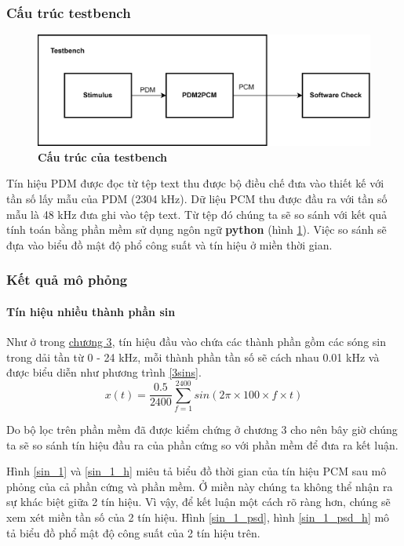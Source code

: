\subsubsection{Cấu trúc testbench}
\begin{figure}[H]
    \centering
    \includegraphics[width=13cm]{Images/Chuong4/tb/tb_top.png}
    \caption[Cấu trúc của testbench]{\bfseries \fontsize{12pt}{0pt}\selectfont  Cấu trúc của testbench}
    \label{tb_top}
\end{figure}

Tín hiệu PDM được đọc từ tệp text thu được bộ điều chế đưa vào thiết kế với tần số lấy mẫu của PDM (2304 kHz). Dữ liệu PCM thu được đầu ra với tần số mẫu là 48 kHz đưa ghi vào tệp text. Từ tệp đó chúng ta sẽ so sánh với kết quả tính toán bằng phần mềm sử dụng ngôn ngữ \textbf{python} (hình \ref{tb_top}). Việc so sánh sẽ đựa vào biểu đồ mật độ phổ công suất và tín hiệu ở miền thời gian.

\subsubsection{Kết quả mô phỏng}
\paragraph{Tín hiệu nhiều thành phần sin}
Như ở trong \hyperref[chuong3]{chương 3}, tín hiệu đầu vào chứa các thành phần gồm các sóng sin trong dải tần từ 0 - 24 kHz, mỗi thành phần tần số sẽ cách nhau 0.01 kHz và được biểu diễn như phương trình \ref{3sins}.
\begin{equation} \label{3sins}
    x(t) = \frac{0.5}{2400}\sum^{2400}_{f = 1}sin(2\pi \times 100 \times f \times t)
\end{equation}

Do bộ lọc trên phần mềm đã được kiểm chứng ở chương 3 cho nên bây giờ chúng ta sẽ so sánh tín hiệu đầu ra của phần cứng so với phần mềm để đưa ra kết luận.


Hình \ref{sin_1} và \ref{sin_1_h} miêu tả biểu đồ thời gian của tín hiệu PCM sau mô phỏng của cả phần cứng và phần mềm. Ở miền này chúng ta không thể nhận ra sự khác biệt giữa 2 tín hiệu. Vì vậy, để kết luận một cách rõ ràng hơn, chúng sẽ xem xét miền tần số của 2 tín hiệu. Hình \ref{sin_1_psd}, hình \ref{sin_1_psd_h} mô tả biểu đồ phổ mật độ công suất của 2 tín hiệu trên.

